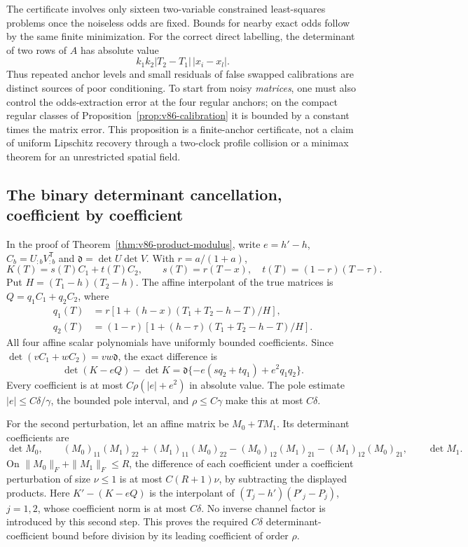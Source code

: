 The certificate involves only sixteen two-variable constrained
least-squares problems once the noiseless odds are fixed. Bounds for
nearby exact odds follow by the same finite minimization. For the
correct direct labelling, the determinant of two rows of $A$ has
absolute value
\[
        k_1k_2|T_2-T_1|\,|x_i-x_l|.
\]
Thus repeated anchor levels and small residuals of false swapped
calibrations are distinct sources of poor conditioning. To start
from noisy \emph{matrices}, one must also control the odds-extraction
error at the four regular anchors; on the compact regular classes
of Proposition~\ref{prop:v86-calibration} it is bounded by a constant
times the matrix error. This proposition is a finite-anchor certificate,
not a claim of uniform Lipschitz recovery through a two-clock profile
collision or a minimax theorem for an unrestricted spatial field.

\subsection{The binary determinant cancellation, coefficient by coefficient}
In the proof of Theorem~\ref{thm:v86-product-modulus}, write
$e=h'-h$, $C_b=U_{:b}V_{:b}^{\mathsf T}$ and
$\mathfrak d=\det U\det V$. With $r=a/(1+a)$,
\[
 K(T)=s(T)C_1+t(T)C_2,
 \qquad s(T)=r(T-x),\quad t(T)=(1-r)(T-\tau).
\]
Put $H=(T_1-h)(T_2-h)$. The affine interpolant of the true matrices
is $Q=q_1C_1+q_2C_2$, where
\begin{align*}
 q_1(T)&=r\left[1+(h-x)(T_1+T_2-h-T)/H\right],\\
 q_2(T)&=(1-r)\left[1+(h-\tau)(T_1+T_2-h-T)/H\right].
\end{align*}
All four affine scalar polynomials have uniformly bounded coefficients.
Since $\det(vC_1+wC_2)=vw\mathfrak d$, the exact difference is
\begin{equation}\label{eq:v87-explicit-det-cancellation}
 \det(K-eQ)-\det K
       =\mathfrak d\{-e(sq_2+tq_1)+e^2q_1q_2\}.
\end{equation}
Every coefficient is at most $C\rho(|e|+e^2)$ in absolute value.
The pole estimate $|e|\le C\delta/\gamma$, the bounded pole interval,
and $\rho\le C\gamma$ make this at most $C\delta$.

For the second perturbation, let an affine matrix be $M_0+TM_1$.
Its determinant coefficients are
\[
 \det M_0,\qquad
 (M_0)_{11}(M_1)_{22}+(M_1)_{11}(M_0)_{22}
 -(M_0)_{12}(M_1)_{21}-(M_1)_{12}(M_0)_{21},\qquad
 \det M_1.
\]
On $\|M_0\|_F+\|M_1\|_F\le R$, the difference of each coefficient
under a coefficient perturbation of size $\nu\le1$ is at most
$C(R+1)\nu$, by subtracting the displayed products. Here
$K'-(K-eQ)$ is the interpolant of
$(T_j-h')(P'_j-P_j)$, $j=1,2$, whose coefficient norm is at most
$C\delta$. No inverse channel factor is introduced by this second
step. This proves the required $C\delta$ determinant-coefficient
bound before division by its leading coefficient of order $\rho$.

